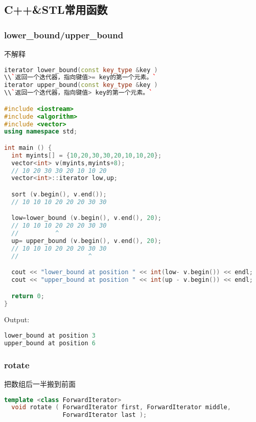 \subsection{C++\&STL常用函数}
    \subsubsection{lower\_bound/upper\_bound}
	不解释\\
	\begin{lstlisting}[language=c++]
iterator lower_bound(const key_type &key )
\\`返回一个迭代器，指向键值>= key的第一个元素。`
iterator upper_bound(const key_type &key )
\\`返回一个迭代器，指向键值> key的第一个元素。`

#include <iostream>
#include <algorithm>
#include <vector>
using namespace std;

int main () {
  int myints[] = {10,20,30,30,20,10,10,20};
  vector<int> v(myints,myints+8);           
  // 10 20 30 30 20 10 10 20
  vector<int>::iterator low,up;

  sort (v.begin(), v.end());                
  // 10 10 10 20 20 20 30 30

  low=lower_bound (v.begin(), v.end(), 20);           
  // 10 10 10 20 20 20 30 30
  //          ^
  up= upper_bound (v.begin(), v.end(), 20);           
  // 10 10 10 20 20 20 30 30
  //                   ^

  cout << "lower_bound at position " << int(low- v.begin()) << endl;
  cout << "upper_bound at position " << int(up - v.begin()) << endl;

  return 0;
}
	\end{lstlisting}
	Output:\\
	\begin{lstlisting}[language=c++]
lower_bound at position 3
upper_bound at position 6
	\end{lstlisting}
	
    \subsubsection{rotate}
	把数组后一半搬到前面\\
	\begin{lstlisting}[language=c++]
template <class ForwardIterator>
  void rotate ( ForwardIterator first, ForwardIterator middle,
                ForwardIterator last );
	\end{lstlisting}
	
